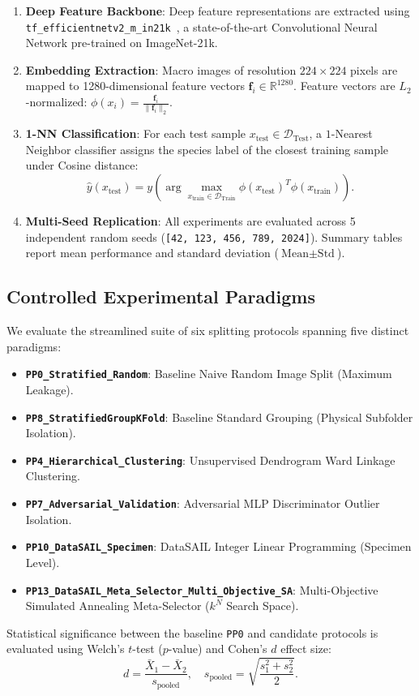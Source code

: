 \begin{enumerate}[label=\textbf{\arabic*:}, leftmargin=*]
\item \textbf{Deep Feature Backbone}: Deep feature representations are extracted using \texttt{tf\_efficientnetv2\_m\_in21k}~\cite{efficientnetv2}, a state-of-the-art Convolutional Neural Network pre-trained on ImageNet-21k.
\item \textbf{Embedding Extraction}: Macro images of resolution $224 \times 224$ pixels are mapped to 1280-dimensional feature vectors $\boldsymbol{f}_i \in \mathbb{R}^{1280}$. Feature vectors are $L_2$-normalized: $\phi(x_i) = \frac{\boldsymbol{f}_i}{\|\boldsymbol{f}_i\|_2}$.
\item \textbf{1-NN Classification}: For each test sample $x_{\text{test}} \in \mathcal{D}_{\text{Test}}$, a $1$-Nearest Neighbor classifier assigns the species label of the closest training sample under Cosine distance:
\begin{equation}
\hat{y}(x_{\text{test}}) = y\left( \arg\max_{x_{\text{train}} \in \mathcal{D}_{\text{Train}}} \phi(x_{\text{test}})^T \phi(x_{\text{train}}) \right).
\end{equation}
\item \textbf{Multi-Seed Replication}: All experiments are evaluated across 5 independent random seeds (\texttt{[42, 123, 456, 789, 2024]}). Summary tables report mean performance and standard deviation ($\text{Mean} \pm \text{Std}$).
\end{enumerate}

\subsection{Controlled Experimental Paradigms}
We evaluate the streamlined suite of six splitting protocols spanning five distinct paradigms:
\begin{itemize}
\item \textbf{\texttt{PP0\_Stratified\_Random}}: Baseline Naive Random Image Split (Maximum Leakage).
\item \textbf{\texttt{PP8\_StratifiedGroupKFold}}: Baseline Standard Grouping (Physical Subfolder Isolation).
\item \textbf{\texttt{PP4\_Hierarchical\_Clustering}}: Unsupervised Dendrogram Ward Linkage Clustering.
\item \textbf{\texttt{PP7\_Adversarial\_Validation}}: Adversarial MLP Discriminator Outlier Isolation.
\item \textbf{\texttt{PP10\_DataSAIL\_Specimen}}: DataSAIL Integer Linear Programming (Specimen Level).
\item \textbf{\texttt{PP13\_DataSAIL\_Meta\_Selector\_Multi\_Objective\_SA}}: Multi-Objective Simulated Annealing Meta-Selector ($k^N$ Search Space).
\end{itemize}

Statistical significance between the baseline \texttt{PP0} and candidate protocols is evaluated using Welch's $t$-test ($p$-value) and Cohen's $d$ effect size:
\begin{equation}
d = \frac{\bar{X}_1 - \bar{X}_2}{s_{\text{pooled}}}, \quad s_{\text{pooled}} = \sqrt{\frac{s_1^2 + s_2^2}{2}}.
\end{equation}
